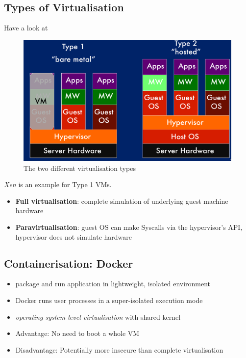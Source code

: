 \documentclass[a4paper]{article}
\begin{document}
\begin{multicols}{3}
\subsection*{Types of Virtualisation}
 Have a look at 

\begin{figure}[H]
    \includegraphics[width=\linewidth]{vmtypes.png}
    \caption{The two different virtualisation types}
    \label{fig:vmtypes}
\end{figure}

\textit{Xen} is an example for Type 1 VMs.

\begin{itemize}
    \item \textbf{Full virtualisation}: complete simulation of underlying guest machine hardware
    \item \textbf{Paravirtualisation}: guest OS can make Syscalls via the hypervisor's API, hypervisor does not simulate hardware
\end{itemize}

\subsection*{Containerisation: Docker}
\begin{itemize}
    \item package and run application in lightweight, isolated environment
    \item Docker runs user processes in a super-isolated execution mode
    \item \textit{operating system level virtualisation} with shared kernel
    \item Advantage: No need to boot a whole VM
    \item Disadvantage: Potentially more insecure than complete virtualisation
\end{itemize}


\end{multicols}
\end{document}
